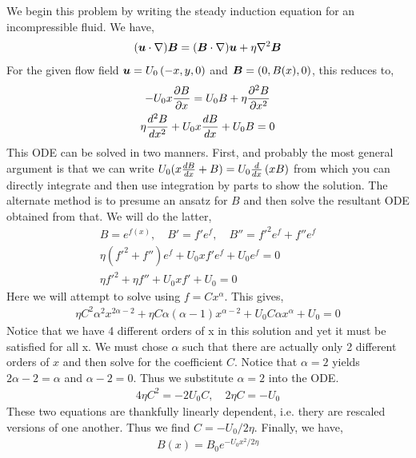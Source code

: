 \documentclass{article}
\begin{document}
\section{}
    We begin this problem by writing the steady induction equation for an
    incompressible fluid. We have, 
    \begin{gather*}
        (\boldsymbol{u}\cdot\nabla)\boldsymbol{B} = (\boldsymbol{B}\cdot\nabla)\boldsymbol{u} + \eta\nabla^2\boldsymbol{B}
    \end{gather*}
    For the given flow field $\boldsymbol{u} = U_0\left(-x, y, 0\right)$ and $\boldsymbol{B} =
    \left(0, B(x), 0\right)$, this reduces to,
    \begin{gather*}
        -U_0x\frac{\partial B}{\partial x} = U_0B + \eta\frac{\partial^2 B}{\partial x^2}\\
        \eta\frac{d^2 B}{d x^2} + U_0x\frac{d B}{d x} + U_0B = 0
    \end{gather*}
    This ODE can be solved in two manners. First, and probably the most general
    argument is that we can write $U_0(x\frac{d B}{d x} + B) = U_0\frac{d }{d x}\left(xB\right)$ from which
    you can directly integrate and then use integration by parts to show the
    solution. The alternate method is to presume an ansatz for $B$ and then
    solve the resultant ODE obtained from that. We will do the latter, 
    \begin{gather*}
        B = e^{f(x)}, \quad B' = f'e^f, \quad B'' = f'^2e^f + f''e^f\\
        \eta\left(f'^2 + f''\right)e^f + U_0xf'e^f + U_0e^f = 0\\
        \eta f'^2 + \eta f'' + U_0xf' + U_0 = 0
    \end{gather*}
    Here we will attempt to solve using $f = Cx^{\alpha}$. This gives,
    \begin{gather*}
        \eta C^2\alpha^2x^{2\alpha - 2} + \eta C\alpha(\alpha -1)x^{\alpha - 2}
        + U_0C\alpha x^{\alpha} + U_0 = 0 
   \end{gather*}
    Notice that we have 4 different orders of x in this solution and yet it must
    be satisfied for all x. We must chose $\alpha$ such that there are actually
    only 2 different orders of $x$ and then solve for the coefficient $C$.
    Notice that $\alpha = 2$ yields $2\alpha - 2 = \alpha$ and $\alpha - 2 =
    0$. Thus we substitute $\alpha = 2$ into the ODE. 
    \begin{gather*}
        4\eta C^2 = -2U_0C, \quad 2\eta C = -U_0
    \end{gather*}
    These two equations are thankfully linearly dependent, i.e. thery are
    rescaled versions of one another. Thus we find $C = -U_0/2\eta$. Finally, we
    have,
    \begin{gather*}
        B(x) = B_0e^{-U_0x^2/2\eta}
    \end{gather*}
\end{document}
